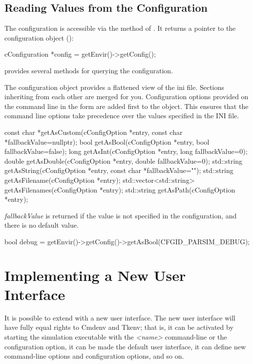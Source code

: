\subsection{Reading Values from the Configuration}

The configuration is accessible via the  method of .
It returns a pointer to the configuration object ():

\begin{cpp}
cConfiguration *config = getEnvir()->getConfig();
\end{cpp}

 provides several methods for querying the configuration.

\begin{note}
The configuration object provides a flattened view of the ini file. Sections
inheriting from each other are merged for you. Configuration options provided
on the command line in the form  are added first to the object.
This ensures that the command line options take precedence over the values specified
in the INI file.
\end{note}

\begin{cpp}
const char *getAsCustom(cConfigOption *entry, const char *fallbackValue=nullptr);
bool getAsBool(cConfigOption *entry, bool fallbackValue=false);
long getAsInt(cConfigOption *entry, long fallbackValue=0);
double getAsDouble(cConfigOption *entry, double fallbackValue=0);
std::string getAsString(cConfigOption *entry, const char *fallbackValue="");
std::string getAsFilename(cConfigOption *entry);
std::vector<std::string> getAsFilenames(cConfigOption *entry);
std::string getAsPath(cConfigOption *entry);
\end{cpp}

\textit{fallbackValue} is returned if the value is not specified in the configuration,
and there is no default value.

\begin{cpp}
bool debug = getEnvir()->getConfig()->getAsBool(CFGID_PARSIM_DEBUG);
\end{cpp}


\section{Implementing a New User Interface}
\label{sec:plugin-exts:userinterface}

It is possible to extend {\opp} with a new user interface. The new
user interface will have fully equal rights to Cmdenv and Tkenv; that is,
it can be activated by starting the simulation executable with the
 \textit{<name>} command-line or the 
configuration option, it can be made the default user interface,
it can define new command-line options and configuration options,
and so on.

